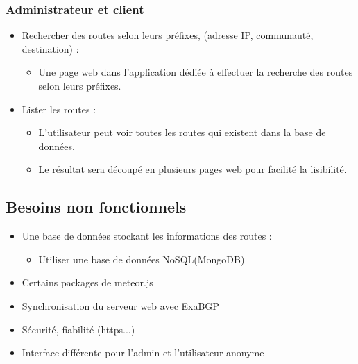 \subsubsection{Administrateur et client}
\begin{itemize}

\item Rechercher des routes selon leurs préfixes, (adresse IP, communauté, destination) :
	\begin{itemize}
		\item Une page web dans l'application dédiée à effectuer la recherche des routes selon leurs préfixes.
	\end{itemize}

\item Lister les routes :
	\begin{itemize}
		\item L'utilisateur peut voir toutes les routes qui existent dans la base de données.
        \item Le résultat sera découpé en plusieurs pages web pour facilité la lisibilité.
	\end{itemize}
\end{itemize}    

\subsection{Besoins non fonctionnels}

\begin{itemize}
\item Une base de données stockant les informations des routes : 
	\begin{itemize}
		\item Utiliser une base de données NoSQL(MongoDB)
	\end{itemize}
    
\item Certains packages de meteor.js
\item Synchronisation du serveur web avec ExaBGP
\item Sécurité, fiabilité (https...)
\item Interface différente pour l'admin et l'utilisateur anonyme
\end{itemize}